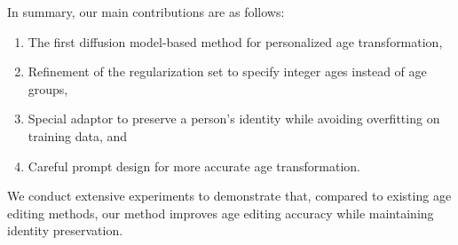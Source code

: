 In summary, our main contributions are as follows:
\begin{enumerate}
    \item The first diffusion model-based method for personalized age transformation,
    \item Refinement of the regularization set to specify integer ages instead of age groups,
    \item Special adaptor to preserve a person's identity while avoiding overfitting on training data, and
    \item Careful prompt design for more accurate age transformation.
\end{enumerate}
We conduct extensive experiments to demonstrate that, compared to existing age editing methods, our method improves age editing accuracy while maintaining identity preservation. 